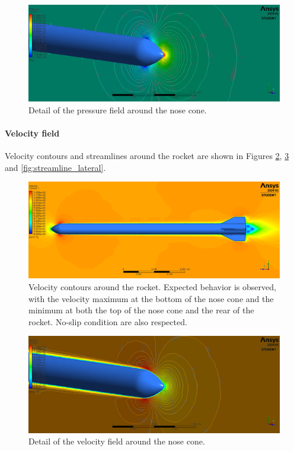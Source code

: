 \begin{figure}[H]
    \centering
    \includegraphics[width=.8\textwidth]{img/Results/Contours_Pressure_Nose.png}
    \caption{Detail of the pressure field around the nose cone.}
    \label{fig:pressure_field_nose}
\end{figure}


\paragraph{Velocity field}

Velocity contours and streamlines around the rocket are shown in Figures \ref{fig:velocity_field}, \ref{fig:velocity_field_nose} and \ref{fig:streamline_lateral}.

\begin{figure}[H]
    \centering
    \includegraphics[width=.8\textwidth]{img/Results/Coutours_Velocity.png}
    \caption{Velocity contours around the rocket. Expected behavior is observed, with the velocity maximum at the bottom of the nose cone and the minimum at both the top of the nose cone and the rear of the rocket. No-slip condition are also respected.}
    \label{fig:velocity_field}
\end{figure}

\begin{figure}[H]
    \centering
    \includegraphics[width=.8\textwidth]{img/Results/Contours_Velocity_Nose.png}
    \caption{Detail of the velocity field around the nose cone.}
    \label{fig:velocity_field_nose}
\end{figure}

